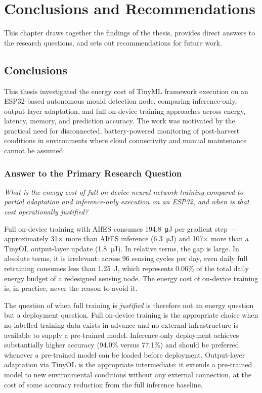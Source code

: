 \chapter{Conclusions and Recommendations}\label{cap:conclusions_recommendations}

This chapter draws together the findings of the thesis, provides direct answers to the research questions, and sets out recommendations for future work.

\section{Conclusions}\label{sec:conclusions}

This thesis investigated the energy cost of TinyML framework execution on an ESP32-based autonomous mould detection node, comparing inference-only, output-layer adaptation, and full on-device training approaches across energy, latency, memory, and prediction accuracy. The work was motivated by the practical need for disconnected, battery-powered monitoring of post-harvest conditions in environments where cloud connectivity and manual maintenance cannot be assumed.

\subsection{Answer to the Primary Research Question}

\textit{What is the energy cost of full on-device neural network training compared to partial adaptation and inference-only execution on an ESP32, and when is that cost operationally justified?}

Full on-device training with AIfES consumes \SI{194.8}{\micro\joule} per gradient step --- approximately 31$\times$ more than AIfES inference (\SI{6.3}{\micro\joule}) and 107$\times$ more than a TinyOL output-layer update (\SI{1.8}{\micro\joule}). In relative terms, the gap is large. In absolute terms, it is irrelevant: across 96 sensing cycles per day, even daily full retraining consumes less than \SI{1.25}{\joule}, which represents 0.06\% of the total daily energy budget of a redesigned sensing node. The energy cost of on-device training is, in practice, never the reason to avoid it.

The question of when full training is \textit{justified} is therefore not an energy question but a deployment question. Full on-device training is the appropriate choice when no labelled training data exists in advance and no external infrastructure is available to supply a pre-trained model. Inference-only deployment achieves substantially higher accuracy (94.0\% versus 77.1\%) and should be preferred whenever a pre-trained model can be loaded before deployment. Output-layer adaptation via TinyOL is the appropriate intermediate: it extends a pre-trained model to new environmental conditions without any external connection, at the cost of some accuracy reduction from the full inference baseline.

